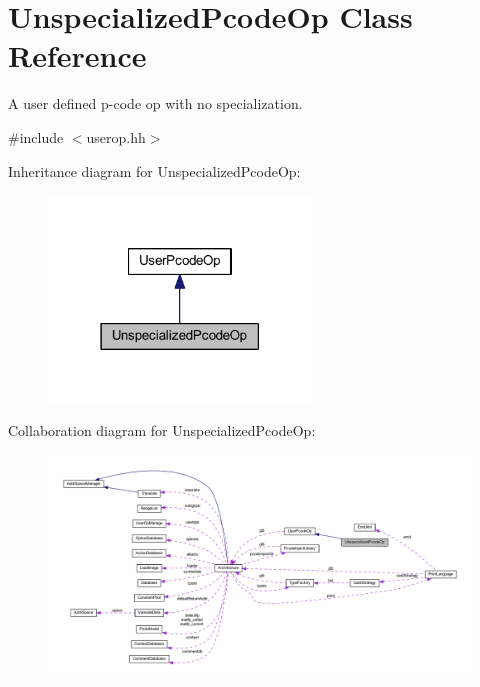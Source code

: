 \hypertarget{class_unspecialized_pcode_op}{}\section{Unspecialized\+Pcode\+Op Class Reference}
\label{class_unspecialized_pcode_op}


A user defined p-\/code op with no specialization.  




{\ttfamily \#include $<$userop.\+hh$>$}



Inheritance diagram for Unspecialized\+Pcode\+Op\+:
\nopagebreak
\begin{figure}[H]
\begin{center}
\leavevmode
\includegraphics[width=198pt]{class_unspecialized_pcode_op__inherit__graph}
\end{center}
\end{figure}


Collaboration diagram for Unspecialized\+Pcode\+Op\+:
\nopagebreak
\begin{figure}[H]
\begin{center}
\leavevmode
\includegraphics[width=350pt]{class_unspecialized_pcode_op__coll__graph}
\end{center}
\end{figure}
